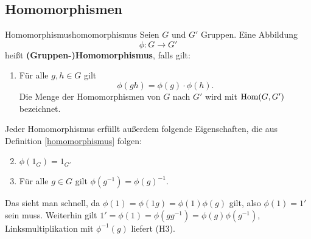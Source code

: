 \subsection{Homomorphismen}
\label{subsec:homomorphismen}
\begin{definition}{Homomorphismus}{homomorphismus}
Seien $G$ und $G'$ Gruppen. Eine Abbildung 
\begin{equation}
\phi: G \to G'
\end{equation}
heißt \textbf{(Gruppen-)Homomorphismus}, falls gilt:
\begin{enumerate}[({H}1)]
\item Für alle $g,h \in G$ gilt 
\begin{equation}
\phi(gh) = \phi(g) \cdot \phi(h).
\end{equation}
Die Menge der Homomorphismen von $G$ nach $G'$ wird mit $\operatorname{\text{Hom}} (G, G')$ bezeichnet.
\end{enumerate}
\end{definition}
\begin{bemerkung}
Jeder Homomorphismus erfüllt außerdem folgende Eigenschaften, die aus Definition \ref{homomorphismus} folgen:
\begin{enumerate}[({H}1)]
\setcounter{enumi}{1}
\item $\phi (1_G) = 1_{G'}$
\item Für alle $g \in G$ gilt $\phi (g^{-1}) = \phi (g)^{-1}$.
\end{enumerate}
Das sieht man schnell, da $\phi(1) = \phi(1g) = \phi(1) \phi(g)$ gilt, also $\phi(1) = 1'$ sein muss. Weiterhin gilt $1' = \phi(1) = \phi(gg^{-1}) = \phi(g) \phi(g^{-1})$, Linksmultiplikation mit $\phi^{-1}(g)$ liefert (H3).
\end{bemerkung}
